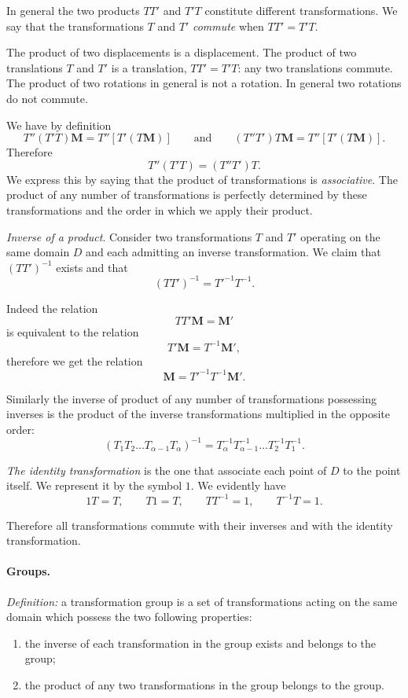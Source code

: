 In general the two products $TT'$ and $T'T$ constitute different transformations. We say that the transformations $T$ and $T'$ \emph{commute} when $TT'=T'T$.

\begin{ex}
  The product of two displacements is a displacement. The product of two translations $T$ and $T'$ is a translation, $TT'=T'T$: any two translations commute. The product of two rotations in general is not a rotation. In general two rotations do not commute.
\end{ex}

We have by definition
\[
T''(T'T)\mathbf{M}=T''[T'(T\mathbf{M})]\qquad\text{and}\qquad(T''T')T\mathbf{M}=T''[T'(T\mathbf{M})].
\]
Therefore
\[
T''(T'T)=(T''T')T.
\]
We express this by saying that the product of transformations is \emph{associative}. The product of any number of transformations is perfectly determined by these transformations and the order in which we apply their product.

\somespace

\emph{Inverse of a product}. Consider two transformations $T$ and $T'$ operating on the same domain $D$ and each admitting an inverse transformation. We claim that $(TT')^{-1}$ exists and that
\[
(TT')^{-1}=T'^{-1}T^{-1}.
\]

Indeed the relation
\[
TT'\mathbf{M}=\mathbf{M}'
\]
is equivalent to the relation
\[
T'\mathbf{M}=T^{-1}\mathbf{M}',
\]
therefore we get the relation
\[
\mathbf{M}=T'^{-1}T^{-1}\mathbf{M}'.
\]

Similarly the inverse of product of any number of transformations possessing inverses is the product of the inverse transformations multiplied in the opposite order:
\[
(T_{1}T_{2}\dots T_{\alpha-1}T_{\alpha})^{-1}=T_{\alpha}^{-1}T_{\alpha-1}^{-1}\dots T_{2}^{-1}T_{1}^{-1}.
\]

\emph{The identity transformation} is the one that associate each point of $D$ to the point itself. We represent it by the symbol $1$. We evidently have
\[
1T=T,\qquad T1=T,\qquad TT^{-1}=1,\qquad T^{-1}T=1.
\]

{\small Therefore all transformations commute with their inverses and with the identity transformation.}


\paragraph{Groups.}
\label{sec:59}
\emph{Definition:} a transformation group is a set of transformations acting on the same domain which possess the two following properties:
\begin{enumerate}
\item the inverse of each transformation in the group exists and belongs to the group;
\item the product of any two transformations in the group belongs to the group.
\end{enumerate}

